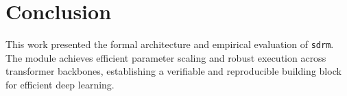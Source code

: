 \section{Conclusion}
This work presented the formal architecture and empirical evaluation of \texttt{sdrm}. The module achieves efficient parameter scaling and robust execution across transformer backbones, establishing a verifiable and reproducible building block for efficient deep learning.
